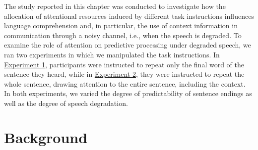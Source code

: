 \documentclass[a4paper, nobind]{templates/ociamthesis}
\begin{document}
The study reported in this chapter was conducted to investigate how the allocation of attentional resources induced by different task instructions influences language comprehension and, in particular, the use of context information in communication through a noisy channel, i.e., when the speech is degraded.
To examine the role of attention on predictive processing under degraded speech, we ran two experiments in which we manipulated the task instructions.
In \protect\hyperlink{experiment1a}{Experiment 1}, participants were instructed to repeat only the final word of the sentence they heard,
while in \protect\hyperlink{experiment1b}{Experiment 2}, they were instructed to repeat the whole sentence, drawing attention to the entire sentence, including the context.
In both experiments, we varied the degree of predictability of sentence endings as well as the degree of speech degradation.

\hypertarget{background}{%
\section{Background}\label{background}}
\end{document}
